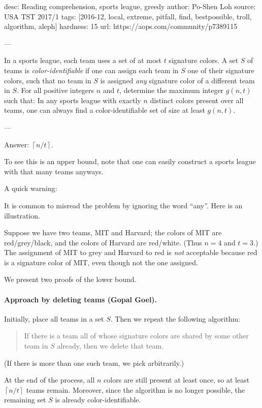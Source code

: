 desc: Reading comprehension, sports league, greedy
author: Po-Shen Loh
source: USA TST 2017/1
tags: [2016-12, local, extreme, pitfall, find, bestpossible, troll, algorithm, aleph]
hardness: 15
url: https://aops.com/community/p7389115

---

In a sports league, each team uses a set of at most $t$ signature colors.
A set $S$ of teams is \emph{color-identifiable} if one can assign
each team in $S$ one of their signature colors,
such that no team in $S$ is assigned
\emph{any} signature color of a different team in $S$.
For all positive integers $n$ and $t$,
determine the maximum integer $g(n,t)$ such that:
In any sports league with exactly $n$ distinct colors
present over all teams, one can always
find a color-identifiable set of size at least $g(n,t)$.

---

Answer: $\left\lceil n/t \right\rceil$.

To see this is an upper bound, note that one can easily construct
a sports league with that many teams anyways.

A quick warning:
\begin{remark*}
  It is common to misread the problem by ignoring the word ``any''.
  Here is an illustration.

  Suppose we have two teams, MIT and Harvard;
  the colors of MIT are red/grey/black, and
  the colors of Harvard are red/white.
  (Thus $n=4$ and $t=3$.)
  The assignment of MIT to grey and Harvard to red
  is \emph{not} acceptable because red is a
  signature color of MIT, even though not the one assigned.
\end{remark*}

We present two proofs of the lower bound.

\paragraph{Approach by deleting teams (Gopal Goel).}
Initially, place all teams in a set $S$.
Then we repeat the following algorithm:
\begin{quote}
If there is a team all of whose signature colors
are shared by some other team in $S$ already,
then we delete that team.
\end{quote}
(If there is more than one such team, we pick arbitrarily.)

At the end of the process,
all $n$ colors are still present at least once,
so at least $\left\lceil n/t \right\rceil$ teams remain.
Moreover, since the algorithm is no longer possible,
the remaining set $S$ is already color-identifiable.

